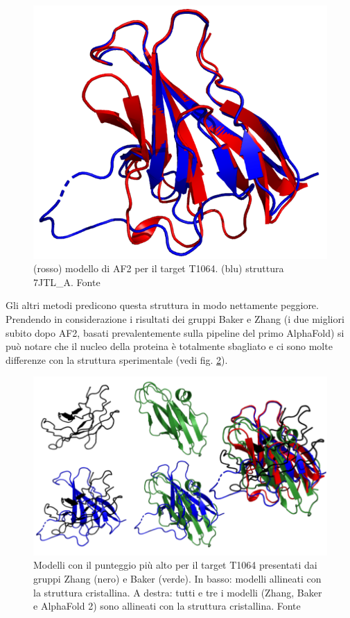 \begin{figure}[!htb]
	\includegraphics[scale=0.3]{images/t1064_model.png}
	\caption{(rosso) modello di AF2 per il target T1064. (blu) struttura 7JTL\_A. Fonte \cite{blopigAF}}
	\label{fig:t1064-afmodel}
	\endminipage\hfill
\end{figure}

Gli altri metodi predicono questa struttura in modo nettamente peggiore. Prendendo in considerazione i risultati dei gruppi Baker e Zhang (i due migliori subito dopo AF2, basati prevalentemente sulla pipeline del primo AlphaFold)  si può notare che il nucleo della proteina è totalmente sbagliato e ci sono molte differenze con la struttura sperimentale (vedi fig. \ref{fig:altri-modelli-t1064}).

\begin{figure}[!htb]
	\centering
	\includegraphics[scale=0.7]{images/t1064-altri-modelli.png}
	\caption{Modelli con il punteggio più alto per il target T1064 presentati dai gruppi Zhang (nero) e Baker (verde). In basso: modelli allineati con la struttura cristallina. A destra: tutti e tre i modelli (Zhang, Baker e AlphaFold 2) sono allineati con la struttura cristallina. Fonte\cite{blopigAF}}
	\label{fig:altri-modelli-t1064}
\end{figure}

